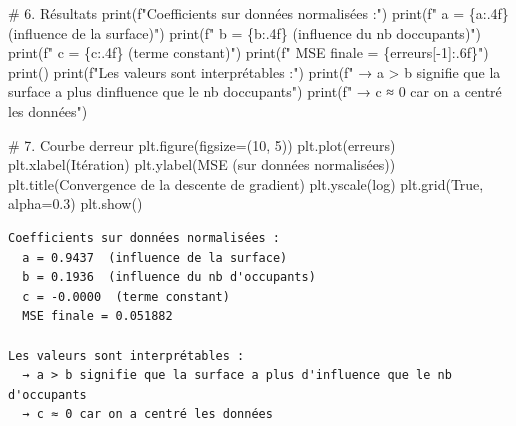 \documentclass[
  french,
  11pt,
  a4paper,
]{scrbook}
\newenvironment{Shaded}{}{}
\newcommand{\BuiltInTok}[1]{\textcolor[rgb]{0.84,0.23,0.29}{#1}}
\newcommand{\CommentTok}[1]{\textcolor[rgb]{0.42,0.45,0.49}{#1}}
\newcommand{\DecValTok}[1]{\textcolor[rgb]{0.00,0.36,0.77}{#1}}
\newcommand{\FloatTok}[1]{\textcolor[rgb]{0.00,0.36,0.77}{#1}}
\newcommand{\NormalTok}[1]{\textcolor[rgb]{0.14,0.16,0.18}{#1}}
\newcommand{\OperatorTok}[1]{\textcolor[rgb]{0.14,0.16,0.18}{#1}}
\newcommand{\SpecialCharTok}[1]{\textcolor[rgb]{0.00,0.36,0.77}{#1}}
\newcommand{\SpecialStringTok}[1]{\textcolor[rgb]{0.01,0.18,0.38}{#1}}
\newcommand{\StringTok}[1]{\textcolor[rgb]{0.01,0.18,0.38}{#1}}
\newcommand{\VariableTok}[1]{\textcolor[rgb]{0.89,0.38,0.04}{#1}}
\begin{document}
\begin{tcolorbox}
\begin{Shaded}
\begin{Highlighting}[]
\CommentTok{\# 6. Résultats}
\BuiltInTok{print}\NormalTok{(}\SpecialStringTok{f"Coefficients sur données normalisées :"}\NormalTok{)}
\BuiltInTok{print}\NormalTok{(}\SpecialStringTok{f"  a = }\SpecialCharTok{\{}\NormalTok{a}\SpecialCharTok{:.4f\}}\SpecialStringTok{  (influence de la surface)"}\NormalTok{)}
\BuiltInTok{print}\NormalTok{(}\SpecialStringTok{f"  b = }\SpecialCharTok{\{}\NormalTok{b}\SpecialCharTok{:.4f\}}\SpecialStringTok{  (influence du nb d\textquotesingle{}occupants)"}\NormalTok{)}
\BuiltInTok{print}\NormalTok{(}\SpecialStringTok{f"  c = }\SpecialCharTok{\{}\NormalTok{c}\SpecialCharTok{:.4f\}}\SpecialStringTok{  (terme constant)"}\NormalTok{)}
\BuiltInTok{print}\NormalTok{(}\SpecialStringTok{f"  MSE finale = }\SpecialCharTok{\{}\NormalTok{erreurs[}\OperatorTok{{-}}\DecValTok{1}\NormalTok{]}\SpecialCharTok{:.6f\}}\SpecialStringTok{"}\NormalTok{)}
\BuiltInTok{print}\NormalTok{()}
\BuiltInTok{print}\NormalTok{(}\SpecialStringTok{f"Les valeurs sont interprétables :"}\NormalTok{)}
\BuiltInTok{print}\NormalTok{(}\SpecialStringTok{f"  → a \textgreater{} b signifie que la surface a plus d\textquotesingle{}influence que le nb d\textquotesingle{}occupants"}\NormalTok{)}
\BuiltInTok{print}\NormalTok{(}\SpecialStringTok{f"  → c ≈ 0 car on a centré les données"}\NormalTok{)}

\CommentTok{\# 7. Courbe d\textquotesingle{}erreur}
\NormalTok{plt.figure(figsize}\OperatorTok{=}\NormalTok{(}\DecValTok{10}\NormalTok{, }\DecValTok{5}\NormalTok{))}
\NormalTok{plt.plot(erreurs)}
\NormalTok{plt.xlabel(}\StringTok{\textquotesingle{}Itération\textquotesingle{}}\NormalTok{)}
\NormalTok{plt.ylabel(}\StringTok{\textquotesingle{}MSE (sur données normalisées)\textquotesingle{}}\NormalTok{)}
\NormalTok{plt.title(}\StringTok{\textquotesingle{}Convergence de la descente de gradient\textquotesingle{}}\NormalTok{)}
\NormalTok{plt.yscale(}\StringTok{\textquotesingle{}log\textquotesingle{}}\NormalTok{)}
\NormalTok{plt.grid(}\VariableTok{True}\NormalTok{, alpha}\OperatorTok{=}\FloatTok{0.3}\NormalTok{)}
\NormalTok{plt.show()}
\end{Highlighting}
\end{Shaded}

\begin{verbatim}
Coefficients sur données normalisées :
  a = 0.9437  (influence de la surface)
  b = 0.1936  (influence du nb d'occupants)
  c = -0.0000  (terme constant)
  MSE finale = 0.051882

Les valeurs sont interprétables :
  → a > b signifie que la surface a plus d'influence que le nb d'occupants
  → c ≈ 0 car on a centré les données
\end{verbatim}


\end{tcolorbox}
\end{document}
